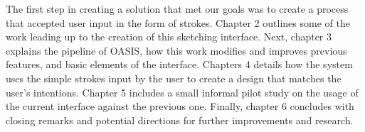 The first step in creating a solution that met our goals was to create a process that accepted user input in the form of strokes. Chapter 2 outlines some of the work leading up to the creation of this sketching interface. Next, chapter 3 explains the pipeline of OASIS, how this work modifies and improves previous features, and basic elements of the interface. Chapters 4 details how the system uses the simple strokes input by the user to create a design that matches the user's intentions. Chapter 5 includes a small informal pilot study on the usage of the current interface against the previous one. Finally, chapter 6 concludes with closing remarks and potential directions for further improvements and research.